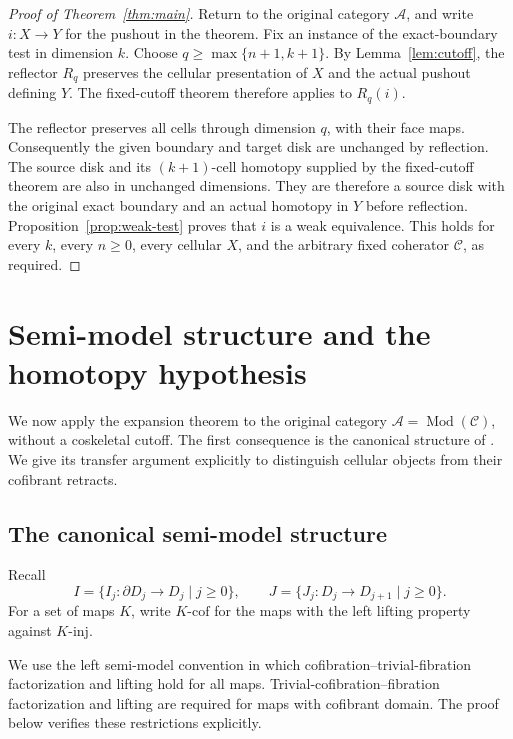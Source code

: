 \documentclass[11pt,letterpaper]{article}
\numberwithin{equation}{section}
\theoremstyle{plain}
\theoremstyle{definition}
\theoremstyle{remark}
\begin{document}
\begin{proof}[Proof of Theorem~\ref{thm:main}]
Return to the original category \(\mathcal A\), and write
\(i:X\to Y\) for the pushout in the theorem.  Fix an instance of
the exact-boundary test in dimension \(k\).  Choose
\(q\ge\max\{n+1,k+1\}\).  By Lemma~\ref{lem:cutoff}, the
reflector \(R_q\) preserves the cellular presentation of \(X\)
and the actual pushout defining \(Y\).  The fixed-cutoff theorem
therefore applies to \(R_q(i)\).

The reflector preserves all cells through dimension \(q\), with
their face maps.  Consequently the given boundary and target disk are
unchanged by reflection.  The source disk and its \((k+1)\)-cell
homotopy supplied by the fixed-cutoff theorem are also in unchanged
dimensions.  They are therefore a source disk with the original exact
boundary and an actual homotopy in \(Y\) before reflection.
Proposition~\ref{prop:weak-test} proves that \(i\) is a weak
equivalence.  This holds for every \(k\), every \(n\ge0\),
every cellular \(X\), and the arbitrary fixed coherator
\(\mathcal C\), as required.
\end{proof}

\section{Semi-model structure and the homotopy hypothesis}
\label{sec:consequences}

We now apply the expansion theorem to the original category
\(\mathcal A=\operatorname{Mod}(\mathcal C)\), without a coskeletal cutoff.
The first consequence is the canonical structure of
\cite[Theorem~5.3.5]{Henry2016}.  We give its transfer argument explicitly
to distinguish cellular objects from their cofibrant retracts.

\subsection{The canonical semi-model structure}

Recall
\[
 I=\{I_j:\partial D_j\longrightarrow D_j\mid j\ge0\},
 \qquad
 J=\{J_j:D_j\longrightarrow D_{j+1}\mid j\ge0\}.
\]
For a set of maps \(K\), write \(K\text{-}\mathrm{cof}\)
for the maps with the left lifting property
against \(K\text{-}\mathrm{inj}\).

We use the left semi-model convention in which
cofibration--trivial-fibration factorization and lifting hold for all maps.
Trivial-cofibration--fibration factorization and lifting are required for maps
with cofibrant domain.  The proof below verifies these restrictions
explicitly.
\end{document}
